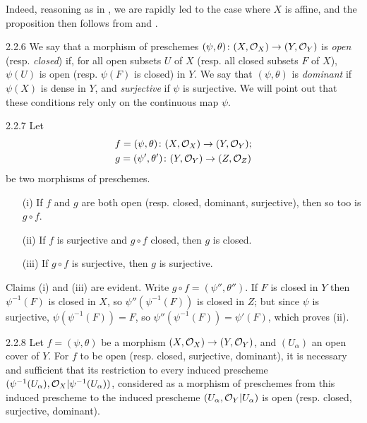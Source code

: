 \documentclass[../main.tex]{subfiles}
\begin{document}
Indeed, reasoning as in
, we are rapidly led to the case where $X$ is affine, and the proposition
then follows from  and .

\begin{env}{2.2.6} We say that a morphism of preschemes
$(\psi,\theta)\colon(X,\mathcal{O}_X)\to(Y,\mathcal{O}_Y)$ is \emph{open} (resp. \emph{closed})
if, for all open subsets $U$ of $X$ (resp. all closed subsets $F$ of $X$),
$\psi(U)$ is open (resp. $\psi(F)$ is closed) in $Y$. We say that
$(\psi,\theta)$ is \emph{dominant} if $\psi(X)$ is dense in $Y$, and
\emph{surjective} if $\psi$ is surjective. We will point out that these
conditions rely only on the continuous map $\psi$.
\end{env}

\begin{env}[Proposition]{2.2.7} Let
\begin{gather*}
  f=(\psi,\theta)\colon(X,\mathcal{O}_X)\to(Y,\mathcal{O}_Y);\\
  g=(\psi',\theta')\colon(Y,\mathcal{O}_Y)\to(Z,\mathcal{O}_Z)
\end{gather*}
be two morphisms of
preschemes.
\begin{itemize}
  \item[(i)] If $f$ and $g$ are both open (resp. closed, dominant, surjective),
             then so too is $g\circ f$.
  \item[(ii)] If $f$ is surjective and $g\circ f$ closed, then $g$ is closed.
  \item[(iii)] If $g\circ f$ is surjective, then $g$ is surjective.
\end{itemize}
\end{env}
Claims (i) and (iii) are evident. Write $g\circ f=(\psi'',\theta'')$.
If $F$ is closed in $Y$ then $\psi^{-1}(F)$ is closed in $X$, so
$\psi''(\psi^{-1}(F))$ is closed in $Z$; but since $\psi$ is surjective,
$\psi(\psi^{-1}(F))=F$, so $\psi''(\psi^{-1}(F))=\psi'(F)$, which proves (ii).

\begin{env}[Proposition]{2.2.8}
Let $f=(\psi,\theta)$ be a morphism
$(X,\mathcal{O}_X)\to(Y,\mathcal{O}_Y)$, and $(U_\alpha)$ an open cover of $Y$. For $f$ to be
open (resp. closed, surjective, dominant), it is necessary and sufficient that
its restriction to every induced prescheme
$(\psi^{-1}(U_\alpha),\mathcal{O}_X|\psi^{-1}(U_\alpha))$, considered as a morphism of
preschemes from this induced prescheme to the induced prescheme
$(U_\alpha,\mathcal{O}_Y|U_\alpha)$ is open (resp. closed, surjective, dominant).
\end{env}
\end{document}
